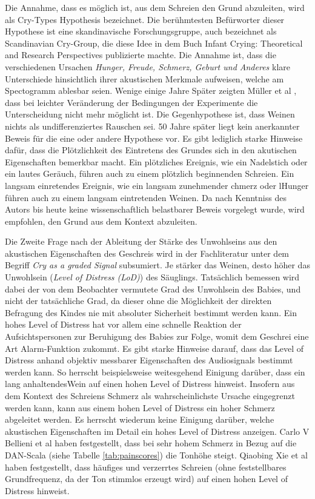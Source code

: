 Die Annahme, dass es möglich ist, aus dem Schreien den Grund abzuleiten, wird als \glqq Cry-Types Hypothesis\grqq{} bezeichnet. Die berühmtesten Befürworter dieser Hypothese ist eine skandinavische Forschungsgruppe, auch bezeichnet als \glqq Scandinavian Cry-Group\grqq , die diese Idee in dem Buch \glqq Infant Crying: Theoretical and Research Perspectives\grqq \cite{crygroup} publizierte machte. Die Annahme ist, dass die verschiedenen Ursachen \emph{Hunger, Freude, Schmerz, Geburt und Anderes} klare Unterschiede hinsichtlich ihrer akustischen Merkmale aufweisen, welche am Spectogramm ablesbar seien. Wenige einige Jahre Später zeigten Müller et al \cite{cryisnoise}, dass bei leichter Veränderung der Bedingungen der Experimente die Unterscheidung nicht mehr möglicht ist. Die Gegenhypothese ist, dass Weinen \glqq nichts als undifferenziertes Rauschen\grqq{} sei. 50 Jahre später liegt kein anerkannter Beweis für die eine oder andere Hypothese vor. Es gibt lediglich starke Hinweise dafür, dass die Plötzlichkeit des Eintretens des Grundes sich in den akutischen Eigenschaften bemerkbar macht. Ein plötzliches Ereignis, wie ein Nadelstich oder ein lautes Geräuch, führen auch zu einem plötzlich beginnenden Schreien. Ein langsam einretendes Ereignis, wie ein langsam zunehmender chmerz oder lHunger führen auch zu einem langsam eintretenden Weinen. Da nach Kenntniss des Autors bis heute keine wissenschaftlich belastbarer Beweis vorgelegt wurde, wird empfohlen, den Grund aus dem Kontext abzuleiten.\cite[S. 9 - 13, 17 - 19]{signal}

Die Zweite Frage nach der Ableitung der Stärke des Unwohlseins aus den akustischen Eigenschaften des Geschreis wird in der Fachliteratur unter dem Begriff \emph{Cry as a graded Signal} subsumiert. Je \glqq stärker\grqq{} das Weinen, desto höher das Unwohlsein (\emph{Level of Distress (LoD)}) des Säuglings. Tatsächlich bemessen wird dabei der von dem Beobachter vermutete Grad des Unwohlsein des Babies, und nicht der tatsächliche Grad, da dieser ohne die Möglichkeit der direkten Befragung des Kindes nie mit absoluter Sicherheit bestimmt werden kann. Ein hohes Level of Distress hat vor allem eine schnelle Reaktion der Aufsichtspersonen zur Beruhigung des Babies zur Folge, womit dem Geschrei eine Art Alarm-Funktion zukommt. Es gibt starke Hinweise darauf, dass das Level of Distress anhand objektiv messbarer Eigenschaften des Audiosignals bestimmt werden kann. So herrscht beispielsweise weitesgehend Einigung darüber, dass ein \glqq lang\grqq{} anhaltendesWein auf einen hohen Level of Distress hinweist. Insofern aus dem Kontext des Schreiens Schmerz als wahrscheinlichste Ursache eingegrenzt werden kann, kann aus einem hohen Level of Distress ein hoher Schmerz abgeleitet werden. \cite[S. 13 - 17]{signal} \cite{lod} Es herrscht wiederum keine Einigung darüber, welche akustischen Eigenschaften im Detail ein hohes Level of Distress anzeigen. Carlo V Bellieni et al \cite{dan} haben festgestellt, dass bei sehr hohem Schmerz in Bezug auf die DAN-Scala (siehe Tabelle \ref{tab:painscores}) die Tonhöhe steigt. Qiaobing Xie et al \cite{lod} haben festgestellt, dass häufiges und \glqq verzerrtes\grqq{} Schreien (ohne feststellbares Grundfrequenz, da der Ton stimmlos erzeugt wird)  auf einen hohen Level of Distress hinweist.

